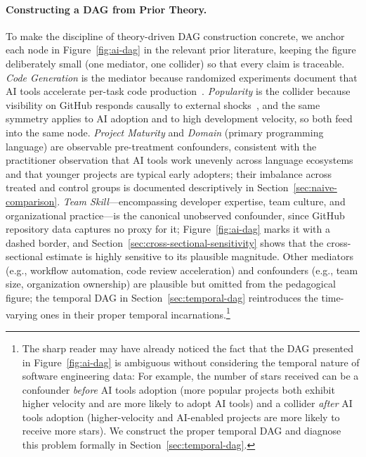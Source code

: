\paragraph{Constructing a DAG from Prior Theory.}
To make the discipline of theory-driven DAG construction concrete, we anchor each node in Figure~\ref{fig:ai-dag} in the relevant prior literature, keeping the figure deliberately small (one mediator, one collider) so that every claim is traceable.
\emph{Code Generation} is the mediator because randomized experiments document that AI tools accelerate per-task code production~\cite{cui2025effects, DBLP:journals/corr/abs-2302-06590, DBLP:conf/icse-seip/ParadisGMNMMZFC25}.
\emph{Popularity} is the collider because visibility on GitHub responds causally to external shocks~\cite{DBLP:conf/icse/FangLHV22}, and the same symmetry applies to AI adoption and to high development velocity, so both feed into the same node.
\emph{Project Maturity} and \emph{Domain} (primary programming language) are observable pre-treatment confounders, consistent with the practitioner observation that AI tools work unevenly across language ecosystems and that younger projects are typical early adopters; their imbalance across treated and control groups is documented descriptively in Section~\ref{sec:naive-comparison}.
\emph{Team Skill}---encompassing developer expertise, team culture, and organizational practice---is the canonical unobserved confounder, since GitHub repository data captures no proxy for it; Figure~\ref{fig:ai-dag} marks it with a dashed border, and Section~\ref{sec:cross-sectional-sensitivity} shows that the cross-sectional estimate is highly sensitive to its plausible magnitude.
Other mediators (e.g., workflow automation, code review acceleration) and confounders (e.g., team size, organization ownership) are plausible but omitted from the pedagogical figure; the temporal DAG in Section~\ref{sec:temporal-dag} reintroduces the time-varying ones in their proper temporal incarnations.\footnote{The sharp reader may have already noticed the fact that the DAG presented in Figure~\ref{fig:ai-dag} is ambiguous without considering the temporal nature of software engineering data: For example, the number of stars received can be a confounder \emph{before} AI tools adoption (more popular projects both exhibit higher velocity and are more likely to adopt AI tools) and a collider \emph{after} AI tools adoption (higher-velocity and AI-enabled projects are more likely to receive more stars).
We construct the proper temporal DAG and diagnose this problem formally in Section~\ref{sec:temporal-dag}.}

